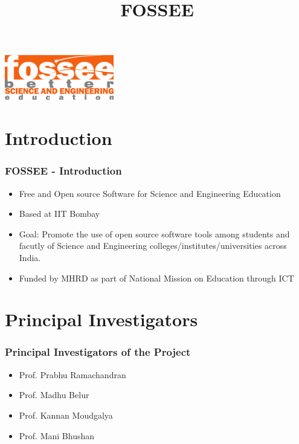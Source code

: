 \documentclass{beamer}
\title{FOSSEE}
\institute[IIT Bombay] {IIT Bombay}
\date{}
\begin{document}
\begin{frame}
   \begin{center}
   \maketitle  
   \includegraphics[scale=2]{fossee.png} \\
   \end{center}
\end{frame}


\section{Introduction}
\begin{frame}
  \frametitle{{FOSSEE} - Introduction}
  \begin{itemize}
  \item Free and Open source Software for Science and Engineering Education 
  \item Based at IIT Bombay
  \item Goal: Promote the use of open source software tools among students and facutly of Science and Engineering colleges/institutes/universities across India.
  \item Funded by MHRD as part of National Mission on Education through ICT
  \end{itemize}  
\end{frame}

\section{Principal Investigators}
\begin{frame}
  \frametitle{Principal Investigators of the Project}
  \begin{itemize}
  \item Prof. Prabhu Ramachandran
  \item Prof. Madhu Belur
  \item Prof. Kannan Moudgalya
  \item Prof. Mani Bhushan
  \end{itemize}
\end{frame}
\end{document}
